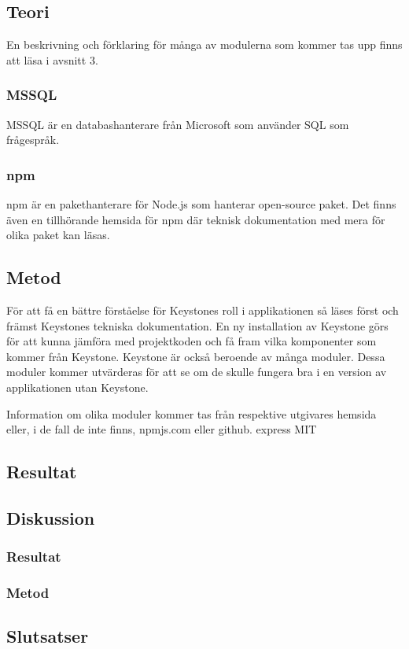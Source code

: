\subsection{Teori}
En beskrivning och förklaring för många av modulerna som kommer tas upp finns att läsa i avsnitt 3.
\subsubsection{MSSQL}
MSSQL är en databashanterare från Microsoft som använder SQL som frågespråk.

\subsubsection{npm}
npm är en pakethanterare för Node.js som hanterar open-source paket. Det finns även en tillhörande hemsida för npm där teknisk dokumentation med mera för olika paket kan läsas. 


\subsection{Metod}
För att få en bättre förståelse för Keystones roll i applikationen så läses först och främst Keystones tekniska dokumentation. En ny installation av Keystone görs för att kunna jämföra med projektkoden och få fram vilka komponenter som kommer från Keystone. Keystone är också beroende av många moduler. Dessa moduler kommer utvärderas för att se om de skulle fungera bra i en version av applikationen utan Keystone. 

Information om olika moduler kommer tas från respektive utgivares hemsida eller, i de fall de inte finns, npmjs.com eller github.
express MIT

\subsection{Resultat}
\subsection{Diskussion}
\subsubsection{Resultat}
\subsubsection{Metod}
\subsection{Slutsatser}
